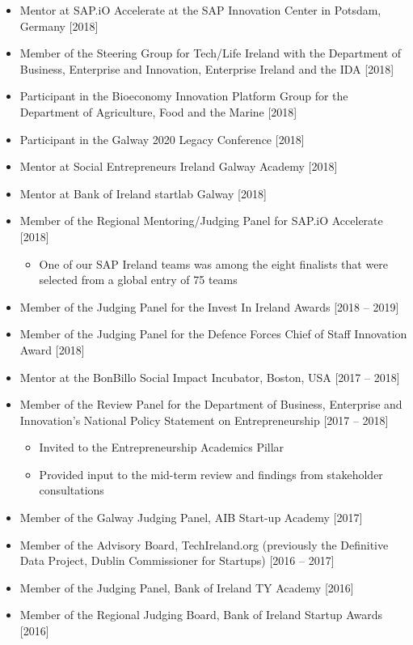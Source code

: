\documentclass[10pt,a4paper]{res} %
\begin{document}
\begin{resume}
\begin{itemize}
\item Mentor at SAP.iO Accelerate at the SAP Innovation Center in Potsdam, Germany [2018]
\item Member of the Steering Group for Tech/Life Ireland with the Department of Business, Enterprise and Innovation, Enterprise Ireland and the IDA [2018]
\item Participant in the Bioeconomy Innovation Platform Group for the Department of Agriculture, Food and the Marine [2018]
\item Participant in the Galway 2020 Legacy Conference [2018]
\item Mentor at Social Entrepreneurs Ireland Galway Academy [2018]
\item Mentor at Bank of Ireland startlab Galway [2018]
\item Member of the Regional Mentoring/Judging Panel for SAP.iO Accelerate [2018]
\begin{itemize} \itemsep -2pt
\item One of our SAP Ireland teams was among the eight finalists that were selected from a global entry of 75 teams
\end{itemize}
\item Member of the Judging Panel for the Invest In Ireland Awards [2018 -- 2019]
\item Member of the Judging Panel for the Defence Forces Chief of Staff Innovation Award [2018]
\item Mentor at the BonBillo Social Impact Incubator, Boston, USA [2017 -- 2018]
\item Member of the Review Panel for the Department of Business, Enterprise and Innovation's National Policy Statement on Entrepreneurship [2017 -- 2018]
\begin{itemize} \itemsep -2pt
\item Invited to the Entrepreneurship Academics Pillar
\item Provided input to the mid-term review and findings from stakeholder consultations
\end{itemize}
\item Member of the Galway Judging Panel, AIB Start-up Academy [2017]
\item Member of the Advisory Board, TechIreland.org (previously the Definitive Data Project, Dublin Commissioner for Startups) [2016 -- 2017]
\item Member of the Judging Panel, Bank of Ireland TY Academy [2016]
\item Member of the Regional Judging Board, Bank of Ireland Startup Awards [2016]

\end{itemize}
\end{resume}
\end{document}
